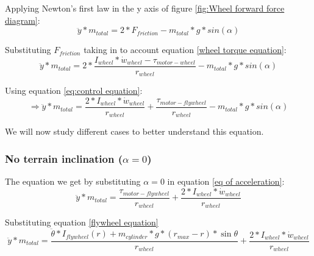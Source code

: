 Applying Newton's first law in the y axis of figure \ref{fig:Wheel forward force diagram}:
\[\ddot{y}*m_{total} = 2 * F_{friction} - m_{total} * g * sin(\alpha)\]

Substituting $F_{friction}$ taking in to account equation \ref{wheel torque equation}:
\[\ddot{y}*m_{total} = 2 * \frac{I_{wheel} * \dot{w}_{wheel}-\tau_{motor-wheel}}{r_{wheel}} - m_{total} * g * sin(\alpha)\]

Using equation \ref{eq:control equation}:
\begin{equation}\label{eq of acceleration}
    \Rightarrow  \ddot{y}*m_{total} = \frac{2*I_{wheel} * \dot{w}_{wheel}}{r_{wheel}} + \frac{\tau_{motor-flywheel}}{r_{wheel}} - m_{total} * g * sin(\alpha)
\end{equation}


We will now study different cases to better understand this equation.
\subsubsection{No terrain inclination ($\alpha = 0$)}
The equation we get by substituting $\alpha = 0$ in equation \ref{eq of acceleration}:
\[\ddot{y}*m_{total} = \frac{\tau_{motor-flywheel}}{r_{wheel}} +\frac{2*I_{wheel} * \dot{w}_{wheel}}{r_{wheel}}\]

Substituting equation \ref{flywheel equation}
\begin{equation}\label{no inclintation eq}
    \ddot{y}*m_{total} = \frac{\ddot{\theta}*I_{flywheel}(r) + m_{cylinder} * g * (r_{max} - r) * \sin{\theta}}{r_{wheel}} +\frac{2*I_{wheel} * \dot{w}_{wheel}}{r_{wheel}}
\end{equation}


